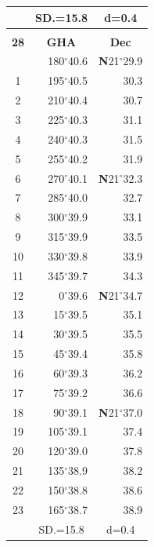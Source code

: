 \documentclass[10pt, a4paper]{report}
\begin{document}
\begin{scriptsize}
\begin{tabular*}{0.2\textwidth}[t]{@{\extracolsep{\fill}}|c|rr|}
\hline
\rule{0pt}{2.4ex} & \multicolumn{1}{c}{SD.=15.8} & \multicolumn{1}{c|}{d=0.4}\\
\hline
\multicolumn{1}{c}{}\\[-0.5ex]\hline
\multicolumn{1}{|c|}{\rule{0pt}{2.6ex}\textbf{28}} & \multicolumn{1}{c}{\textbf{GHA}} & \multicolumn{1}{c|}{\textbf{Dec}}\\
\hline\rule{0pt}{2.6ex}\noindent
0 & 180$^\circ$40.6 & \textbf{N}21$^\circ$29.9\\
1 & 195$^\circ$40.5 & 30.3\\
2 & 210$^\circ$40.4 & 30.7\\
3 & 225$^\circ$40.3 & \raisebox{0.24ex}{\boldmath$\cdot$~\boldmath$\cdot$~~}31.1\\
4 & 240$^\circ$40.3 & 31.5\\
5 & 255$^\circ$40.2 & 31.9\\[2Pt]
6 & 270$^\circ$40.1 & \textbf{N}21$^\circ$32.3\\
7 & 285$^\circ$40.0 & 32.7\\
8 & 300$^\circ$39.9 & 33.1\\
9 & 315$^\circ$39.9 & \raisebox{0.24ex}{\boldmath$\cdot$~\boldmath$\cdot$~~}33.5\\
10 & 330$^\circ$39.8 & 33.9\\
11 & 345$^\circ$39.7 & 34.3\\[2Pt]
12 & 0$^\circ$39.6 & \textbf{N}21$^\circ$34.7\\
13 & 15$^\circ$39.5 & 35.1\\
14 & 30$^\circ$39.5 & 35.5\\
15 & 45$^\circ$39.4 & \raisebox{0.24ex}{\boldmath$\cdot$~\boldmath$\cdot$~~}35.8\\
16 & 60$^\circ$39.3 & 36.2\\
17 & 75$^\circ$39.2 & 36.6\\[2Pt]
18 & 90$^\circ$39.1 & \textbf{N}21$^\circ$37.0\\
19 & 105$^\circ$39.1 & 37.4\\
20 & 120$^\circ$39.0 & 37.8\\
21 & 135$^\circ$38.9 & \raisebox{0.24ex}{\boldmath$\cdot$~\boldmath$\cdot$~~}38.2\\
22 & 150$^\circ$38.8 & 38.6\\
23 & 165$^\circ$38.7 & 38.9\\
\hline
\rule{0pt}{2.4ex} & \multicolumn{1}{c}{SD.=15.8} & \multicolumn{1}{c|}{d=0.4}\\
\hline
\end{tabular*}\noindent
\begin{tabular*}{0.2\textwidth}[t]{@{\extracolsep{\fill}}|c|rr|}

\end{tabular*}
\end{scriptsize}
\end{document}
